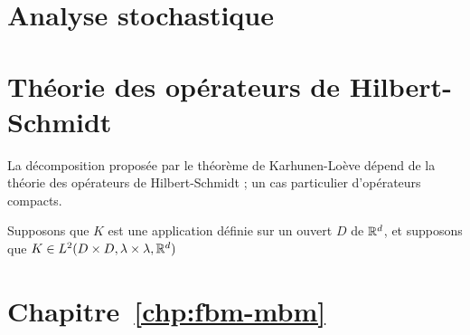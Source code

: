 \section{Analyse stochastique}
\label{sec:stochastic-analysis}

\begin{theoreme}
  \label{thm:kolmogorov}
\end{theoreme}

\section{Théorie des opérateurs de Hilbert-Schmidt}
\label{sec:hilbert-operators}

La décomposition proposée par le théorème de Karhunen-Loève dépend de
la théorie des opérateurs de Hilbert-Schmidt ; un cas particulier
d'opérateurs compacts.

\begin{definition}
  Supposons que $K$ est une application définie sur un ouvert $D$ de
  $\mathbb{R}^d$, et supposons que
  $K\in L^2(D\times D, \lambda\times\lambda, \mathbb{R}^d)$
\end{definition}

\section{Chapitre~\ref{chp:fbm-mbm}}